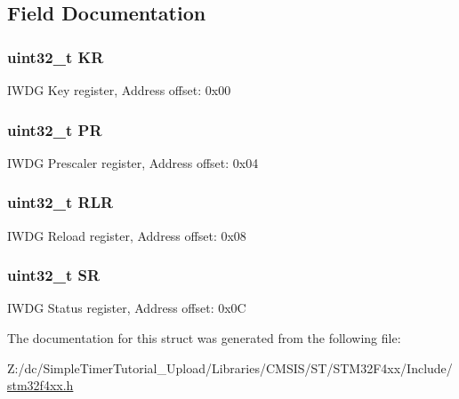 \subsection{Field Documentation}
\hypertarget{struct_i_w_d_g___type_def_a2f692354bde770f2a5e3e1b294ec064b}{
\subsubsection[{K\-R}]{ uint32\-\_\-t K\-R}}\label{struct_i_w_d_g___type_def_a2f692354bde770f2a5e3e1b294ec064b}
I\-W\-D\-G Key register, Address offset\-: 0x00 \hypertarget{struct_i_w_d_g___type_def_af8d25514079514d38c104402f46470af}{
\subsubsection[{P\-R}]{ uint32\-\_\-t P\-R}}\label{struct_i_w_d_g___type_def_af8d25514079514d38c104402f46470af}
I\-W\-D\-G Prescaler register, Address offset\-: 0x04 \hypertarget{struct_i_w_d_g___type_def_a7015e1046dbd3ea8783b33dc11a69e52}{
\subsubsection[{R\-L\-R}]{ uint32\-\_\-t R\-L\-R}}\label{struct_i_w_d_g___type_def_a7015e1046dbd3ea8783b33dc11a69e52}
I\-W\-D\-G Reload register, Address offset\-: 0x08 \hypertarget{struct_i_w_d_g___type_def_af6aca2bbd40c0fb6df7c3aebe224a360}{
\subsubsection[{S\-R}]{ uint32\-\_\-t S\-R}}\label{struct_i_w_d_g___type_def_af6aca2bbd40c0fb6df7c3aebe224a360}
I\-W\-D\-G Status register, Address offset\-: 0x0\-C 

The documentation for this struct was generated from the following file\-:\begin{DoxyCompactItemize}
\item 
Z\-:/dc/\-Simple\-Timer\-Tutorial\-\_\-\-Upload/\-Libraries/\-C\-M\-S\-I\-S/\-S\-T/\-S\-T\-M32\-F4xx/\-Include/\hyperlink{stm32f4xx_8h}{stm32f4xx.\-h}\end{DoxyCompactItemize}
